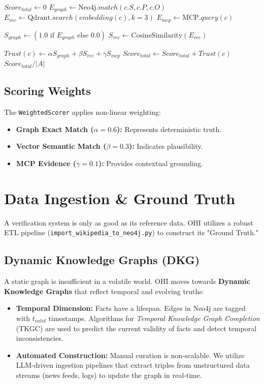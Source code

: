 \documentclass[10pt, a4paper, twocolumn]{article}
\begin{document}
\begin{algorithm}
\caption{Hybrid Verification Protocol}
\label{alg:verify}
\begin{algorithmic}[1]
\State $Score_{total} \gets 0$
    \State $E_{graph} \gets \text{Neo4j}.match(c.S, c.P, c.O)$
    \State $E_{vec} \gets \text{Qdrant}.search(embedding(c), k=3)$
    \State $E_{mcp} \gets \text{MCP}.query(c)$
    
    \State $S_{graph} \gets (1.0 \text{ if } E_{graph} \text{ else } 0.0)$
    \State $S_{vec} \gets \text{CosineSimilarity}(E_{vec})$
    
    \State $Trust(c) \gets \alpha S_{graph} + \beta S_{vec} + \gamma S_{mcp}$
    \State $Score_{total} \gets Score_{total} + Trust(c)$
\EndFor
\State \Return $Score_{total} / |A|$
\end{algorithmic}
\end{algorithm}

\subsection{Scoring Weights}
The \texttt{WeightedScorer} applies non-linear weighting:
\begin{itemize}
    \item \textbf{Graph Exact Match ($\alpha = 0.6$):} Represents deterministic truth.
    \item \textbf{Vector Semantic Match ($\beta = 0.3$):} Indicates plausibility.
    \item \textbf{MCP Evidence ($\gamma = 0.1$):} Provides contextual grounding.
\end{itemize}

\section{Data Ingestion \& Ground Truth}
A verification system is only as good as its reference data. OHI utilizes a robust ETL pipeline (\texttt{import\_wikipedia\_to\_neo4j.py}) to construct its "Ground Truth."

\subsection{Dynamic Knowledge Graphs (DKG)}
A static graph is insufficient in a volatile world. OHI moves towards \textbf{Dynamic Knowledge Graphs} that reflect temporal and evolving truths:
\begin{itemize}
    \item \textbf{Temporal Dimension:} Facts have a lifespan. Edges in Neo4j are tagged with $t_{valid}$ timestamps. Algorithms for \textit{Temporal Knowledge Graph Completion} (TKGC) are used to predict the current validity of facts and detect temporal inconsistencies.
    \item \textbf{Automated Construction:} Manual curation is non-scalable. We utilize LLM-driven ingestion pipelines that extract triples from unstructured data streams (news feeds, logs) to update the graph in real-time.
\end{itemize}
\end{document}
